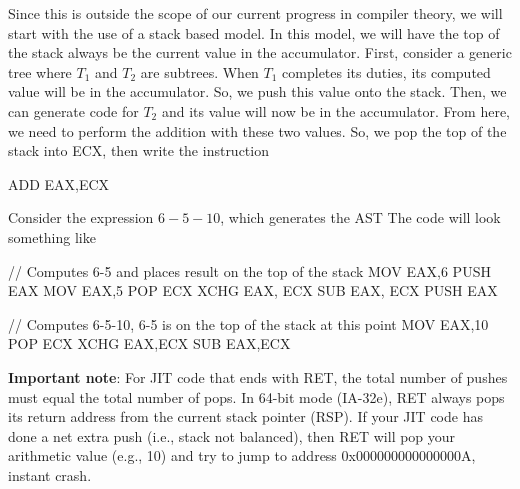 \documentclass{report}
\begin{document}
\begin{itemize}
            \bigbreak \noindent 
            Since this is outside the scope of our current progress in compiler theory, we will start with the use of a stack based model.
            \bigbreak \noindent 
            In this model, we will have the top of the stack always be the current value in the accumulator.
            \bigbreak \noindent 
            First, consider a generic tree 
            \bigbreak \noindent 
            \bigbreak \noindent 
            where $T_{1}$ and $T_{2}$ are subtrees. When $T_{1}$ completes its duties, its computed value will be in the accumulator. So, we push this value onto the stack. Then, we can generate code for $T_{2}$ and its value will now be in the accumulator. From here, we need to perform the addition with these two values. So, we pop the top of the stack into ECX, then write the instruction
            \bigbreak \noindent 
            \begin{cppcode}
            ADD    EAX,ECX
            \end{cppcode}
            \bigbreak \noindent 
            Consider the expression $6-5-10$, which generates the AST 
            \bigbreak \noindent 
            \bigbreak \noindent 
            The code will look something like
            \bigbreak \noindent 
            \begin{cppcode}
            // Computes 6-5 and places result on the top of the stack
            MOV   EAX,6
            PUSH  EAX
            MOV   EAX,5
            POP   ECX
            XCHG  EAX, ECX
            SUB   EAX, ECX
            PUSH  EAX

            // Computes 6-5-10, 6-5 is on the top of the stack at this point
            MOV   EAX,10
            POP   ECX
            XCHG  EAX,ECX
            SUB   EAX,ECX
            \end{cppcode}
            \bigbreak \noindent 
            \textbf{Important note}: For JIT code that ends with RET, the total number of pushes must equal the total number of pops. In 64-bit mode (IA-32e), RET always pops its return address from the current stack pointer (RSP). If your JIT code has done a net extra push (i.e., stack not balanced), then RET will pop your arithmetic value (e.g., 10) and try to jump to address 0x000000000000000A, instant crash.



\end{itemize}
\end{document}
